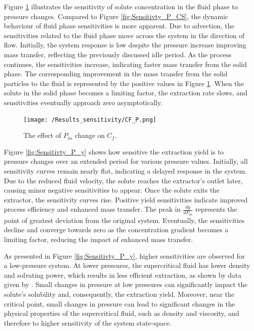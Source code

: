 \documentclass[a4paper,fleqn]{cas-dc}
\begin{document}
	Figure \ref{fig:Sensitivty_P_CF} illustrates the sensitivity of solute concentration in the fluid phase to pressure changes. Compared to Figure \ref{fig:Sensitivty_P_CS}, the dynamic behaviour of fluid phase sensitivities is more apparent. Due to advection, the sensitivities related to the fluid phase move across the system in the direction of flow. Initially, the system response is low despite the pressure increase improving mass transfer, reflecting the previously discussed idle period. As the process continues, the sensitivities increase, indicating faster mass transfer from the solid phase. The corresponding improvement in the mass transfer from the solid particles to the fluid is represented by the positive values in Figure \ref{fig:Sensitivty_P_CF}. When the solute in the solid phase becomes a limiting factor, the extraction rate slows, and sensitivities eventually approach zero asymptotically.
	
	\begin{figure}[!ht]
		\centering
		\texttt{[image: /Results\_sensitivity/CF\_P.png]}
		\caption{The effect of $P_{in}$ change on $C_f$.}
		\label{fig:Sensitivty_P_CF}
	\end{figure}
	
	Figure \ref{fig:Sensitivty_P_y} shows how sensitive the extraction yield is to pressure changes over an extended period for various pressure values. Initially, all sensitivity curves remain nearly flat, indicating a delayed response in the system. Due to the reduced fluid velocity, the solute reaches the extractor's outlet later, causing minor negative sensitivities to appear. Once the solute exits the extractor, the sensitivity curves rise. Positive yield sensitivities indicate improved process efficiency and enhanced mass transfer. The peak in $\frac{dy}{dP_{in}}$ represents the point of greatest deviation from the original system. Eventually, the sensitivities decline and converge towards zero as the concentration gradient becomes a limiting factor, reducing the impact of enhanced mass transfer.
	
	As presented in Figure \ref{fig:Sensitivty_P_y}, higher sensitivities are observed for a low-pressure system. At lower pressures, the supercritical fluid has lower density and solvating power, which results in less efficient extraction, as shown by data given by \citet{Sliczniuk2024}. Small changes in pressure at low pressures can significantly impact the solute's solubility and, consequently, the extraction yield. Moreover, near the critical point, small changes in pressure can lead to significant changes in the physical properties of the supercritical fluid, such as density and viscosity, and therefore to higher sensitivity of the system state-space.
	
\end{document}
